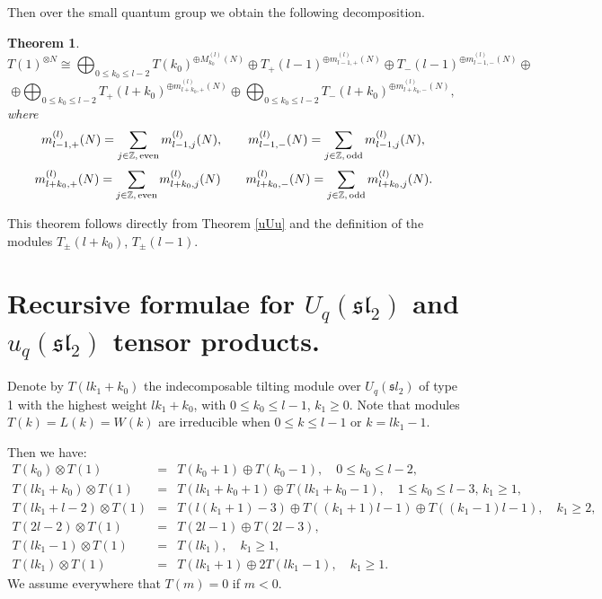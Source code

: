 \documentclass[11pt]{amsart}
\newcommand\lie[1]{\mathfrak{#1}}
\newcommand{\Z}{\mathbb{Z}}
\newtheorem{theorem}{Theorem}[section]
\begin{document}
Then over the small quantum group we obtain the following decomposition. 
\begin{theorem}\label{small_mult}
\[ 
T(1)^{\otimes N} \cong \bigoplus_{0 \leq k_0 \leq l-2} T(k_0)^{\oplus M^{(l)}_{k_0}(N)} \oplus  T_+(l-1)^{\oplus m^{(l)}_{l-1,+}(N)}   \oplus  T_-(l-1)^{\oplus m^{(l)}_{l-1,-}(N)}  \oplus\]   
\[ \oplus  \bigoplus_{0 \leq k_0 \leq l-2}T_+(l + k_0)^{\oplus m^{(l)}_{l+k_0,+}(N)}    
 \oplus  \bigoplus_{0 \leq k_0 \leq l-2}T_-(l + k_0)^{\oplus m^{(l)}_{l+k_0,-}(N)} ,\] 
where 
\[ m^{(l)}_{l-1,+}(N) = \sum_{j \in \Z, \,{\rm even}} m^{(l)}_{l-1,j}(N) ,  \quad \quad  m^{(l)}_{l-1,-}(N) = \sum_{j \in \Z, \,{\rm odd}} m^{(l)}_{l-1,j}(N) ,   \] 
\[  m^{(l)}_{l+k_0,+}(N)  = \sum_{j \in \Z, \,{\rm even} } m^{(l)}_{l+k_0,j}(N)  \quad \quad  m^{(l)}_{l+k_0,-}(N) = \sum_{j \in \Z, \,{\rm odd} } m^{(l)}_{l+k_0,j}(N) . \] 
\end{theorem} 
This theorem follows directly from Theorem \ref{uUu} and the definition of the modules $T_\pm (l + k_0)$, $T_\pm(l-1)$. 



\section{Recursive formulae for $U_q(\lie{sl}_2)$ and $u_q(\lie{sl}_2)$ tensor products.} \label{recursion}
Denote by $T(lk_1 + k_0)$ the indecomposable tilting module over $U_q ({\lie sl}_2)$ of type 1 with the highest weight $lk_1 + k_0$, with $0 \leq k_0 \leq l-1$, $k_1 \geq 0$. Note that modules $T(k)=L(k)=W(k)$ are irreducible when $0\leq k\leq l-1$ or $k=lk_1-1$.

Then we have:
\begin{eqnarray}\label{A}
T(k_0) \otimes T(1) &=& T(k_0+1) \oplus T(k_0 -1),  \quad 0 \leq  k_0 \leq l-2,  \\ 
T(lk_1 + k_0) \otimes T(1) &=& T(lk_1 + k_0 +1) \oplus T(lk_1 + k_0 -1) ,  \quad 1 \leq k_0 \leq l-3,\, k_1\geq 1 , \nonumber \\ 
T(lk_1 + l-2) \otimes T(1) &=& T(l(k_1 +1) -3) \oplus T((k_1+1)l-1) \oplus T((k_1-1)l-1) ,  \quad  k_1\geq 2, \nonumber \\ 
T(2l-2) \otimes T(1) &=& T(2l-1) \oplus T(2l-3) ,\nonumber \\
T(l k_1 -1) \otimes T(1) &=& T(lk_1) , \quad  k_1 \geq 1,\nonumber \\
T(lk_1) \otimes T(1) &=& T(lk_1 +1) \oplus 2 T(lk_1 -1) , \quad k_1\geq 1.\nonumber
\end{eqnarray}
We assume everywhere that $T(m) =0$ if $m <0$. 
\end{document}
